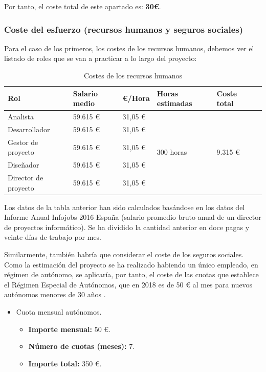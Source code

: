 \documentclass[twoside]{report}
\begin{document}
Por tanto, el coste total de este apartado es: \textbf{30\euro}.

\subsubsection{Coste del esfuerzo (recursos humanos y seguros sociales)}

Para el caso de los primeros, los costes de los recursos humanos, debemos ver el listado de roles que se van a practicar a lo largo del proyecto:

\begin{table}[H]
\center
\begin{tabular}{|l|l|l|l|l|l|}
\hline
Rol                & Salario medio & \euro/Hora   & Horas estimadas & Coste total \\ \hline
Analista           & 59.615 \euro      & 31,05 \euro & \multirow{5}{*}{300 horas} & \multirow{5}{*}{9.315 \euro} \\\cline{1-3}
Desarrollador      & 59.615 \euro      & 31,05 \euro  & & \\\cline{1-3}
Gestor de proyecto & 59.615 \euro      & 31,05 \euro & & \\ \cline{1-3}
Diseñador          & 59.615 \euro      & 31,05 \euro & & \\ \cline{1-3}
Director de proyecto & 59.615 \euro    & 31,05 \euro & & \\ \cline{1-3}
\hline
\end{tabular}
\caption{Costes de los recursos humanos}
\end{table}

Los datos de la tabla anterior han sido calculados basándose en los datos del Informe Anual Infojobs 2016 España \cite{infojobs2016} (salario promedio bruto anual de un director de proyectos informático). Se ha dividido la cantidad anterior en doce pagas y veinte días de trabajo por mes.

Similarmente, también habría que considerar el coste de los seguros sociales. Como la estimación del proyecto se ha realizado  habiendo un único empleado, en régimen de autónomo, se aplicaría, por tanto, el coste de las cuotas que establece el Régimen Especial de Autónomos, que en 2018 es de 50 \euro \vspace{0.1cm} al mes para nuevos autónomos menores de 30 años \cite{segsocialautonomos}.

\begin{itemize}
\item Cuota mensual autónomos.
	\begin{itemize}
	\item \textbf{Importe mensual:} 50 \euro.
	\item \textbf{Número de cuotas (meses): } 7.
	\item \textbf{Importe total: } 350 \euro.
	\end{itemize}
\end{itemize}
\end{document}
